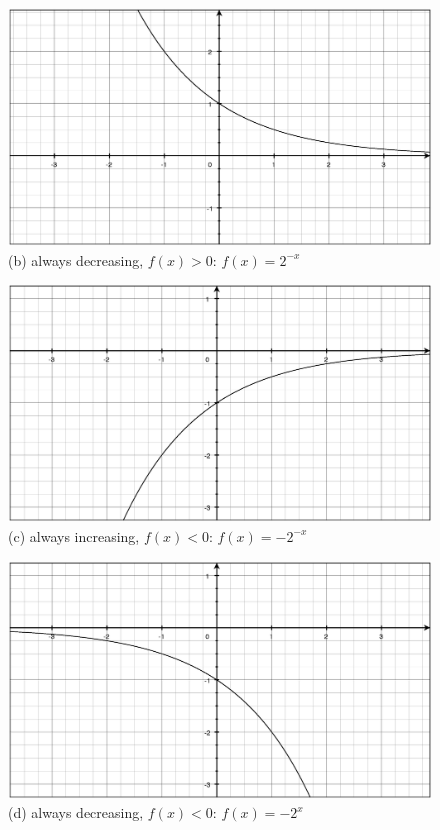 \documentclass{exam}
\begin{document}
\begin{description}
      \begin{figure}[H]
        \centering
        \includegraphics[scale=.3]{section_2.3/problem_39b.eps}
        \caption*{(b) always decreasing, $f(x) > 0$: $f(x) = 2^{-x}$}
      \end{figure}

      \begin{figure}[H]
        \centering
        \includegraphics[scale=.3]{section_2.3/problem_39c.eps}
        \caption*{(c) always increasing, $f(x) < 0$: $f(x) = -2^{-x}$}
      \end{figure}

      \begin{figure}[H]
        \centering
        \includegraphics[scale=.3]{section_2.3/problem_39d.eps}
        \caption*{(d) always decreasing, $f(x) < 0$: $f(x) = -2^x$}
      \end{figure}

  \end{description}
\end{document}
